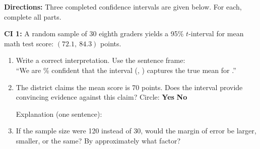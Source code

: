 \documentclass[10pt]{article}
\begin{document}
\namepartnerperiod

\vspace{0.1in}
\textbf{Directions:} Three completed confidence intervals are given below. For each,
complete all parts.

\begin{tcolorbox}[colback=white, colframe=black!40, title=\textbf{Tier R --- Remediate},
    fonttitle=\bfseries, arc=2mm, left=3mm, right=3mm, top=2mm, bottom=2mm]

\textbf{CI 1:} A random sample of 30 eighth graders yields a 95\% $t$-interval for
mean math test score: $\mathbf{(72.1,\ 84.3)}$ points.

\begin{enumerate}[label=\alph*.]
  \item Write a correct interpretation. Use the sentence frame:\\[4pt]
        ``We are \blank{2cm}\% confident that the interval (\blank{2cm}, \blank{2cm})
        \blank{1cm} captures the true mean \blank{5cm} for \blank{5cm}.''

  \item The district claims the mean score is 70 points. Does the interval provide
        convincing evidence against this claim? Circle: \quad \textbf{Yes} \quad \textbf{No}

        \vspace{0.05in}
        Explanation (one sentence): 

  \item If the sample size were 120 instead of 30, would the margin of error be
        larger, smaller, or the same? By approximately what factor?

\end{enumerate}
\end{tcolorbox}
\end{document}
